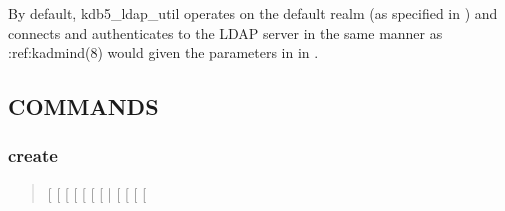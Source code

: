 \documentclass[letterpaper,10pt,english]{sphinxmanual}
\begin{document}
\sphinxAtStartPar
By default, kdb5\_ldap\_util operates on the default realm (as specified
in {\hyperref[\detokenize{admin/conf_files/krb5_conf:krb5-conf-5}]{}}) and connects and authenticates to the LDAP
server in the same manner as :ref:kadmind(8)\textasciigrave{} would given the
parameters in {\hyperref[\detokenize{admin/conf_files/kdc_conf:dbdefaults}]{}} in {\hyperref[\detokenize{admin/conf_files/kdc_conf:kdc-conf-5}]{}}.


\subsection{COMMANDS}
\label{\detokenize{admin/admin_commands/kdb5_ldap_util:commands}}\label{\detokenize{admin/admin_commands/kdb5_ldap_util:kdb5-ldap-util-options-end}}

\subsubsection{create}
\label{\detokenize{admin/admin_commands/kdb5_ldap_util:create}}\label{\detokenize{admin/admin_commands/kdb5_ldap_util:kdb5-ldap-util-create}}\begin{quote}

\sphinxAtStartPar
{}
{[} \sphinxstyleemphasis{subtree\_dn\_list}{]}
{[} \sphinxstyleemphasis{search\_scope}{]}
{[} \sphinxstyleemphasis{container\_reference\_dn}{]}
{[} \sphinxstyleemphasis{mkeytype}{]}
{[} \sphinxstyleemphasis{mkeyVNO}{]}
{[} \sphinxstyleemphasis{mkeyname}{]}
{[} | \sphinxstyleemphasis{stashfilename}{]}
{[}\sphinxstylestrong{\sphinxhyphen{}s}{]}
{[} \sphinxstyleemphasis{max\_ticket\_life}{]}
{[} \sphinxstyleemphasis{max\_renewable\_ticket\_life}{]}
{[}\sphinxstyleemphasis{ticket\_flags}{]}
\end{quote}
\end{document}
